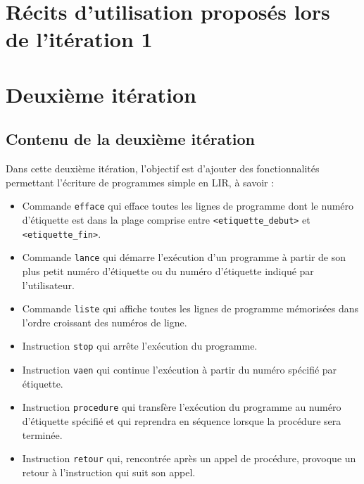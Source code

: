     \chapter*{Récits d'utilisation proposés lors de l'itération 1}
    
    \newpage
    
    
    
    
    
    
    
    
    
    

    \large
    \chapter{Deuxième itération}
    \section*{Contenu de la deuxième itération}
    Dans cette deuxième itération, l'objectif est d'ajouter des
    fonctionnalités permettant l'écriture de programmes simple
    en LIR, à savoir :
    \begin{itemize}
        \item Commande \verb|efface| qui efface toutes les lignes
              de programme dont le numéro d’étiquette est dans la
              plage comprise entre \verb|<etiquette_debut>| et
              \verb|<etiquette_fin>|.
        \item Commande \verb|lance| qui démarre l’exécution d’un
              programme à partir de son plus petit numéro d’étiquette
              ou du numéro d'étiquette indiqué par l'utilisateur.
        \item Commande \verb|liste| qui affiche toutes les lignes de
              programme mémorisées dans l'ordre croissant des numéros
              de ligne.
        \item Instruction \verb|stop| qui arrête l'exécution du programme.
        \item Instruction \verb|vaen| qui continue l'exécution à partir
              du numéro spécifié par étiquette.
        \item Instruction \verb|procedure| qui transfère l'exécution du
              programme au numéro d’étiquette spécifié et qui reprendra
              en séquence lorsque la procédure sera terminée.
        \item Instruction \verb|retour| qui, rencontrée après un appel
              de procédure, provoque un retour à l'instruction qui suit
              son appel.
    \end{itemize}

